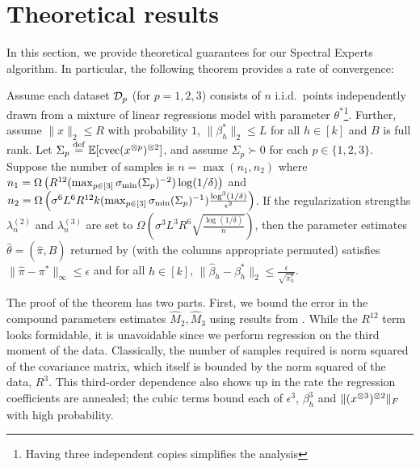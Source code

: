\section{Theoretical results}
\label{sec:theory}

In this section, we provide theoretical guarantees for our Spectral Experts algorithm.
In particular, the following theorem provides a rate of convergence:

\begin{theorem}
\label{thm:convergence}
Assume each dataset $\mathcal{D}_p$ (for $p = 1, 2, 3$) consists of $n$ i.i.d.\ points independently drawn from a mixture
of linear regressions model with parameter $\theta^*$\footnote{Having three independent copies simplifies the analysis}.
Further, assume $\|x\|_2 \le R$ with probability $1$, $\|\beta_h^*\|_2
\le L$ for all $h \in [k]$ and $B$ is full rank.
Let $\Sigma_p \stackrel{\rm def}{=} \operatorname{\mathbb{E}}[\operatorname{cvec}(x^{\otimes p})^{\otimes 2}]$, 
and assume $\Sigma_p \succ 0$ for each $p \in \{1,2,3\}$.
Suppose the number of samples is
$n = \max(n_1,n_2)$
where $n_1 = \Omega\left(R^{12} (\max_{p \in [3]} \sigma_\text{\rm min}(\Sigma_p)^{-2}) \log(1/\delta)\right)$ and
$n_2 = \Omega\left( \sigma^6 L^6 R^{12} k (\max_{p \in [3]} \sigma_\text{\rm min}(\Sigma_p)^{-1}) \frac{\log^3 (1/\delta)}{\epsilon^2} \right)$.
If the regularization strengths $\lambda_n^{(2)}$ and $\lambda_n^{(3)}$ are
set to $\Omega\left(\sigma^3 L^3 R^6 \sqrt{\frac{\log(1/\delta)}{n}}\right)$,
then the parameter estimates $\hat\theta = (\hat\pi, \hat B)$ returned by
 (with the columns appropriate permuted)
satisfies 
$\|\hat\pi - \pi^*\|_{\infty} \le \epsilon$
and for all $h \in [k]$,
$\|\hat\beta_h - \beta^*_h\|_2 \le \frac{\epsilon}{\sqrt{\pi_h^*}}$.
\end{theorem}

The proof of the theorem has two parts.
First, we bound the error in the compound parameters estimates $\hat M_2,\hat M_3$
using results from \citet{Tomioka2011}.
While the $R^{12}$ term looks formidable, it is unavoidable since we
perform regression on the third moment of the data. Classically, the
number of samples required is norm squared of the covariance matrix,
which itself is bounded by the norm squared of the data, $R^3$. This
third-order dependence also shows up in the rate the regression
coefficients are annealed; the cubic terms bound each of $\epsilon^3$,
$\beta_h^3$ and $\|(x^{\otimes 3})^{\otimes 2}\|_F$ with high probability. 


